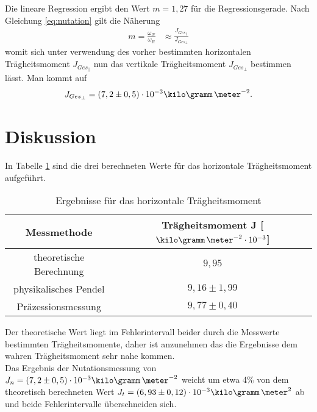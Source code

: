 \documentclass[12pt, a4paper, twoside]{scrartcl}
\begin{document}
Die lineare Regression ergibt den Wert $m=1,27$ für die Regressionsgerade. Nach Gleichung \ref{eq:nutation} gilt die Näherung
\begin{align*}
m= \frac{\omega_N}{\omega_R} &\approx \frac{J_{{Ges}_{||}}}{J_{{Ges}_{\perp}}}
\end{align*}
womit sich unter verwendung des vorher bestimmten horizontalen Trägheitsmoment $J_{{Ges}_{||}}$ nun das vertikale Trägheitsmoment $J_{{Ges}_{\perp}}$ bestimmen lässt. Man kommt auf
\begin{align*}
J_{{Ges}_{\perp}}=\left(7,2\pm0,5\right)\cdot10^{-3}\kilo\gramm\,\meter^{-2}.
\end{align*}






\section{Diskussion}
\label{sec:diskussion}
In Tabelle \ref{tab:ergebnisse} sind die drei berechneten Werte für das horizontale Trägheitsmoment aufgeführt.

\renewcommand{\arraystretch}{1.0}
\begin{table}[H]
\centering
\begin{tabular}{|c|c|}
	\hline
    Messmethode & Trägheitsmoment J [$\kilo\gramm\,\meter^{-2}\cdot10^{-3}$]  \\
    \hline\hline
     theoretische Berechnung & $9,95$  \\ \hline
     physikalisches Pendel & $9,16\pm1,99$  \\ \hline
     Präzessionsmessung & $9,77\pm0,40$  \\ \hline
    \hline
 \end{tabular} 
 \caption{\label{tab:ergebnisse}Ergebnisse für das horizontale Trägheitsmoment}
\end{table}

Der theoretische Wert liegt im Fehlerintervall beider durch die Messwerte bestimmten Trägheitsmomente, daher ist anzunehmen das die Ergebnisse dem wahren Trägheitsmoment sehr nahe kommen.\\

Das Ergebnis der Nutationsmessung von $J_{n}=\left(7,2\pm0,5\right)\cdot10^{-3}\kilo\gramm\,\meter^{-2}$ weicht um etwa 4\% von dem theoretisch berechneten Wert $J_{t}=\left(6,93\pm0,12\right)\cdot10^{-3}\kilo\gramm\,\meter^2$ ab und beide Fehlerintervalle überschneiden sich. 






\end{document}
